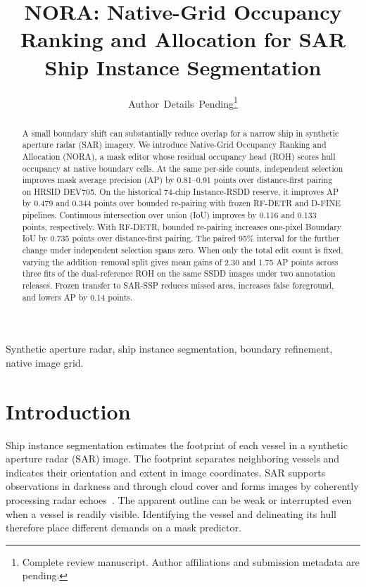 \documentclass[journal]{IEEEtran}
\begin{document}
\raggedbottom
\title{NORA: Native-Grid Occupancy Ranking and Allocation for SAR Ship Instance Segmentation}
\author{Author~Details~Pending\thanks{Complete review manuscript. Author affiliations and submission metadata are pending.}}
\maketitle

\begin{abstract}
A small boundary shift can substantially reduce overlap for a narrow ship in synthetic aperture radar (SAR) imagery. We introduce Native-Grid Occupancy Ranking and Allocation (NORA), a mask editor whose residual occupancy head (ROH) scores hull occupancy at native boundary cells. At the same per-side counts, independent selection improves mask average precision (AP) by 0.81--0.91 points over distance-first pairing on HRSID DEV705. On the historical 74-chip Instance-RSDD reserve, it improves AP by 0.479 and 0.344 points over bounded re-pairing with frozen RF-DETR and D-FINE pipelines. Continuous intersection over union (IoU) improves by 0.116 and 0.133 points, respectively. With RF-DETR, bounded re-pairing increases one-pixel Boundary IoU by 0.735 points over distance-first pairing. The paired 95\% interval for the further change under independent selection spans zero. When only the total edit count is fixed, varying the addition--removal split gives mean gains of 2.30 and 1.75 AP points across three fits of the dual-reference ROH on the same SSDD images under two annotation releases. Frozen transfer to SAR-SSP reduces missed area, increases false foreground, and lowers AP by 0.14 points.
\end{abstract}

\begin{IEEEkeywords}
Synthetic aperture radar, ship instance segmentation, boundary refinement, native image grid.
\end{IEEEkeywords}

\section{Introduction}
\label{sec:introduction}

Ship instance segmentation estimates the footprint of each vessel in a synthetic aperture radar (SAR) image. The footprint separates neighboring vessels and indicates their orientation and extent in image coordinates. SAR supports observations in darkness and through cloud cover and forms images by coherently processing radar echoes~\cite{moreira2013}. The apparent outline can be weak or interrupted even when a vessel is readily visible. Identifying the vessel and delineating its hull therefore place different demands on a mask predictor.
\end{document}
